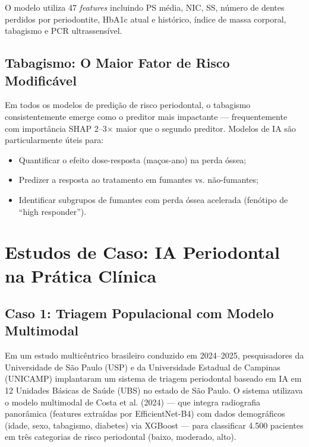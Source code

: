 O modelo utiliza 47 \textit{features} incluindo PS média, NIC, SS, número de dentes perdidos por periodontite, HbA1c atual e histórico, índice de massa corporal, tabagismo e PCR ultrassensível.

\subsection{Tabagismo: O Maior Fator de Risco Modificável}

Em todos os modelos de predição de risco periodontal, o tabagismo consistentemente emerge como o preditor mais impactante --- frequentemente com importância SHAP 2--3$\times$ maior que o segundo preditor. Modelos de IA são particularmente úteis para:
\begin{itemize}
    \item Quantificar o efeito dose-resposta (maços-ano) na perda óssea;
    \item Predizer a resposta ao tratamento em fumantes vs. não-fumantes;
    \item Identificar subgrupos de fumantes com perda óssea acelerada (fenótipo de ``high responder'').
\end{itemize}


\section{Estudos de Caso: IA Periodontal na Prática Clínica}

\subsection{Caso 1: Triagem Populacional com Modelo Multimodal}

Em um estudo multicêntrico brasileiro conduzido em 2024--2025, pesquisadores da Universidade de São Paulo (USP) e da Universidade Estadual de Campinas (UNICAMP) implantaram um sistema de triagem periodontal baseado em IA em 12 Unidades Básicas de Saúde (UBS) no estado de São Paulo. O sistema utilizava o modelo multimodal de Costa et al. (2024) --- que integra radiografia panorâmica (features extraídas por EfficientNet-B4) com dados demográficos (idade, sexo, tabagismo, diabetes) via XGBoost --- para classificar 4.500 pacientes em três categorias de risco periodontal (baixo, moderado, alto).

